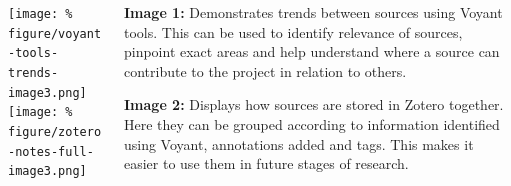 \documentclass[unknownkeysallowed,usepdftitle=false, parskip=full]{beamer}
\newcommand{\secvariable}{nothing}
\newcommand{\mysection}[1]{\renewcommand{\secvariable}{#1}
}
\begin{document}
\begin{frame}\label{\secvariable}
  \begin{columns}[t]
  \begin{column}[c]{0.45\textwidth}
\texttt{[image: \%
figure/voyant-tools-trends-image3.png]}\\
\vspace{12pt}
\texttt{[image: \%
figure/zotero-notes-full-image3.png]}
    \end{column}
    \begin{column}[c]{0.50\textwidth}
    \parbox{\linewidth}{
      
  
 \textbf{Image 1:} Demonstrates trends between sources using Voyant tools. This  can be used to identify relevance of sources, pinpoint exact areas and help understand where a source can contribute to the project in relation to others.    
\vspace{8pt}

\textbf{Image 2:} Displays how sources are stored in Zotero together. Here they can be grouped according to information identified using Voyant, annotations added and tags. This makes it easier to use them in future stages of research.
             
 
   
      }
    \end{column}
    
  \end{columns}

  
\end{frame}
\mysection{radar}
\end{document}
